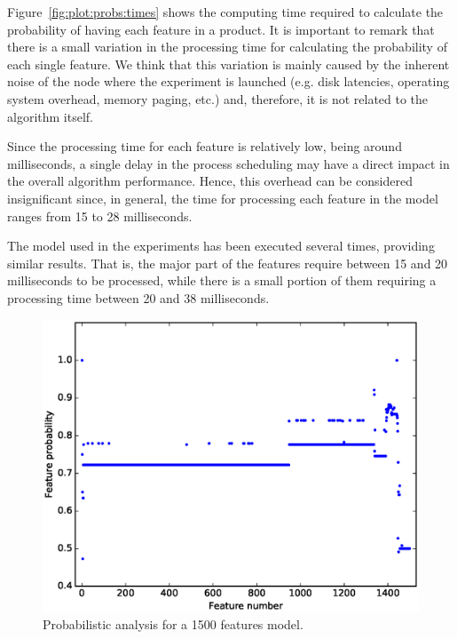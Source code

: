 Figure~\ref{fig:plot:probs:times} shows the computing time required to calculate the probability of having
each feature in a product.
It is important to remark that there is a small variation in the processing time for calculating the probability of each single feature. We think that this variation is mainly caused by the inherent noise of the node where the experiment is launched (e.g. disk latencies, operating
system overhead, memory paging, etc.) and, therefore, it is not related to the algorithm itself.

Since the processing time for each feature is relatively low, being around milliseconds, a single delay in
the process scheduling may have a direct impact in the overall algorithm performance. Hence, this overhead
can be considered insignificant since, in general, the time for processing each feature in the model ranges
from 15 to 28 milliseconds.

The model used in the experiments has been executed several times, providing similar results. That is, the
major part of the features require between 15 and 20 milliseconds to be processed, while there is a small
portion of them requiring a processing time between 20 and 38 milliseconds.

\begin{figure}[h]
        \centering
        \linefigure
        \includegraphics[width=0.8\hsize,angle=0]{plot_probs_probs.eps}
        \linefigure
        \caption{Probabilistic analysis for a 1500 features model.}\label{fig:plot:probs:probs}
\end{figure}

